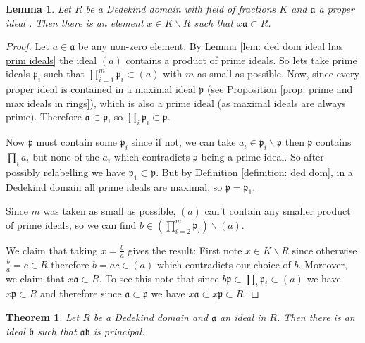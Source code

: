 \documentclass[11pt,a4paper]{report}
\theoremstyle{plain}
\newtheorem{theorem}[subsection]{Theorem}
\newtheorem{lemma}[subsection]{Lemma}
\theoremstyle{definition}
\theoremstyle{definition}
\def\gothb{\mathfrak{b}}
\def\gothp{\mathfrak{p}}
\def\gotha{\mathfrak{a}}
\begin{document}
	\begin{lemma}\label{lem: proper ideal mult by frac is still int}
		Let $R$ be a Dedekind domain with field of fractions $K$ and $\gotha$ a proper ideal . Then there is an element $x \in K \backslash R$ such that $x \gotha \subset R$.
	\end{lemma}
	
	\begin{proof}
		Let $a \in \gotha$ be any non-zero element. By Lemma \ref{lem: ded dom ideal has prim ideals} the ideal $(a)$ contains a product of prime ideals. So lets take prime ideals $\gothp_i$ such that  $\prod_{i=1}^m \gothp_i \subset (a)$ with $m$ as small as possible. Now, since every proper ideal is contained in a maximal ideal $\gothp$ (see Proposition \ref{prop: prime and max ideals in rings}), which is also a prime ideal (as maximal ideals are always prime). Therefore $\gotha \subset \gothp$, so $\prod_i \gothp_i \subset \gothp$. 
		
		Now $\gothp$ must contain some $\gothp_i$ since if not, we can take $a_i \in \gothp_i \backslash \gothp$ then $\gothp$ contains $\prod_i a_i$ but none of the $a_i$ which contradicts $\gothp$ being a prime ideal. So after possibly relabelling we have $\gothp_1 \subset \gothp$. But by Definition \ref{definition: ded dom}, in a Dedekind domain all prime ideals are maximal, so $\gothp=\gothp_1$.
		
		Since $m$ was taken as small as possible, $(a)$ can't contain any smaller product of prime ideals, so we can find $b \in (\prod_{i=2}^m \gothp_i) \backslash (a)$. 
		
		We claim that taking $x=\frac{b}{a}$ gives the result: First note $x \in K \backslash R$ since otherwise $\frac{b}{a}=c \in R$ therefore $b=ac \in (a)$ which contradicts our choice of $b$. Moreover, we claim that $x \gotha \subset R$. To see this note that since $b \gothp \subset \prod_i \gothp_i \subset (a)$ we have $x \gothp \subset R$ and therefore since $\gotha \subset \gothp$ we have $x\gotha \subset x\gothp \subset R$.
		
		
		
	\end{proof}
	
	
	\begin{theorem}\label{thm: ideals are invertible}
		Let $R$ be a Dedekind domain and $\gotha$ an ideal in $R$. Then there is an ideal $\gothb$ such that $\gotha \gothb$ is principal.
	\end{theorem}
	
\end{document}
